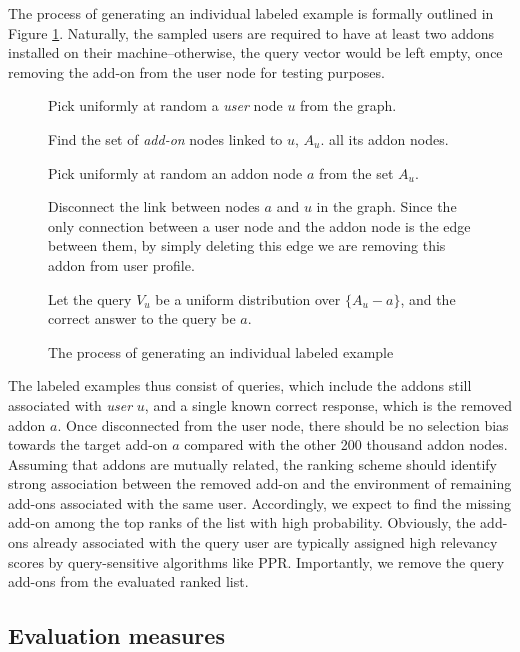 \documentclass[11pt,oneside]{book}
\let\Oldsubsection\subsection
\renewcommand{\subsection}{\FloatBarrier\Oldsubsection}
\begin{document}
The process of generating an individual labeled example is formally outlined in Figure
\ref{fig:example-gen}. Naturally, the sampled users are required to have at least two addons installed on their machine--otherwise, the query vector would be left empty, once removing the add-on from the user node for testing purposes. 

\begin{figure}
\begin{enumerate}[(a)]
\begin{small}
\item Pick uniformly at random a {\it user} node $u$ from the graph.
\item Find the set of {\it add-on} nodes linked to $u$, $A_u$.
  all its addon nodes.
\item Pick uniformly at random an addon node $a$ from the set $A_u$. 
\item Disconnect the link between nodes $a$ and $u$ in the
  graph. Since the only connection between a user node and the addon
  node is the edge between them, by simply deleting this edge we are
  removing this addon from user profile.
\item Let the query $V_u$ be a uniform distribution over $\{A_u-a\}$,
  and the correct answer to the query be $a$. 
\end{small}
\end{enumerate}
\caption{The process of generating an individual labeled example}
\label{fig:example-gen}
\end{figure}

The labeled examples thus consist of queries, which include the addons still associated with {\it user} $u$, and a single known correct response, which is the removed addon $a$.
Once disconnected from the user node, there should be no selection bias towards the target add-on $a$ compared with the other 200 thousand addon nodes. Assuming that addons are mutually related, the ranking scheme should identify strong association between the removed add-on and the environment of remaining add-ons associated with the same user. Accordingly, we expect to find the missing add-on among the top ranks of the list with high probability. Obviously, the add-ons already associated with the query user are  typically assigned high relevancy scores by query-sensitive algorithms like PPR. Importantly, we remove the query add-ons from the evaluated ranked list. 

\subsection{Evaluation measures}
\end{document}
